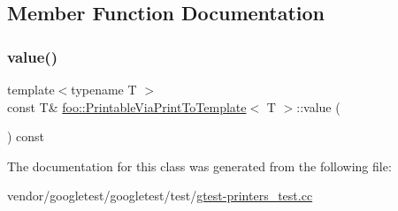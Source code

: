 \subsection{Member Function Documentation}
\mbox{\label{classfoo_1_1_printable_via_print_to_template_a14e0fcac9ae264e37e6212994b2920f6}} 
\subsubsection{\texorpdfstring{value()}{value()}}
{\footnotesize\ttfamily template$<$typename T $>$ \\
const T\& \hyperlink{classfoo_1_1_printable_via_print_to_template}{foo\+::\+Printable\+Via\+Print\+To\+Template}$<$ T $>$\+::value (\begin{DoxyParamCaption}{ }\end{DoxyParamCaption}) const\hspace{0.3cm}{\ttfamily [inline]}}



The documentation for this class was generated from the following file\+:\begin{DoxyCompactItemize}
\item 
vendor/googletest/googletest/test/\hyperlink{gtest-printers__test_8cc}{gtest-\/printers\+\_\+test.\+cc}\end{DoxyCompactItemize}
